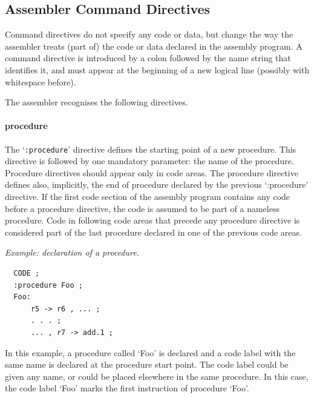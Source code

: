 \documentclass[twoside]{tceusermanual}
\begin{document}

\subsection{Assembler Command Directives}
\label{ssec:directives}

Command directives do not specify any code or data, but change the way the
assembler treats (part of) the code or data declared in the assembly
program.
%
A command directive is introduced by a colon followed by the name string
that identifies it, and must appear at the beginning of a new logical line
(possibly with whitespace before).

The assembler recognises the following directives.

\paragraph{procedure}
The `\verb|:procedure|' directive defines the starting point of a new
procedure. This directive is followed by one mandatory parameter: the name
of the procedure. Procedure directives should appear only in code areas. The
procedure directive defines also, implicitly, the end of procedure declared
by the previous `:procedure' directive. If the first code section of the
assembly program contains any code before a procedure directive, the code
is assumed to be part of a nameless procedure. Code in following code areas
that precede any procedure directive is considered part of the last
procedure declared in one of the previous code areas.

\emph{Example: declaration of a procedure.}
\begin{verbatim}
  CODE ;
  :procedure Foo ;
  Foo:
      r5 -> r6 , ... ;
      . . . ;
      ... , r7 -> add.1 ;
\end{verbatim}
%
In this example, a procedure called `Foo' is declared and a code label with
the same name is declared at the procedure start point. The code label could
be given any name, or could be placed elsewhere in the same procedure. In
this case, the code label `Foo' marks the first instruction of procedure
`Foo'.
\end{document}
